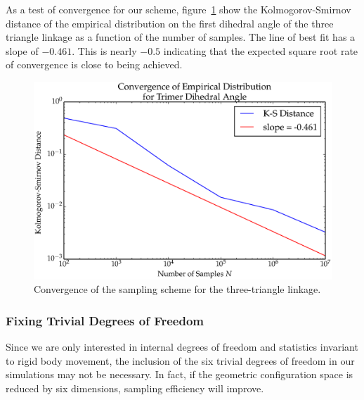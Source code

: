 As a test of convergence for our scheme, figure~\ref{fig:KSD1} show the Kolmogorov-Smirnov distance of the empirical distribution on the first dihedral angle of the three triangle linkage as a function of the number of samples. The line of best fit has a slope of $-0.461$. This is nearly $-0.5$ indicating that the expected square root rate of convergence is close to being achieved. 
\begin{figure}[ht]
\centering
  \includegraphics[scale=0.6]{images/KSD1.eps}
\caption{Convergence of the sampling scheme for the three-triangle linkage.}
\label{fig:KSD1}
\end{figure}


\subsubsection{Fixing Trivial Degrees of Freedom}

Since we are only interested in internal degrees of freedom and statistics invariant to rigid body movement, the inclusion of the six trivial degrees of freedom in our simulations may not be necessary. In fact, if the geometric configuration space is reduced by six dimensions, sampling efficiency will improve. 

